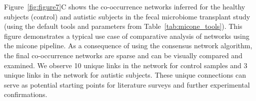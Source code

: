   Figure~\ref{fig:figure7}C shows the co-occurrence networks inferred for the healthy subjects (control) and autistic subjects in the fecal microbiome transplant study~\cite{Kang2017} (using the default tools and parameters from Table~\ref{tab:micone_tools}).
  This figure demonstrates a typical use case of comparative analysis of networks using the \ac{micone} pipeline.
  As a consequence of using the consensus network algorithm, the final co-occurrence networks are sparse and can be visually compared and examined.
  We observe 10 unique links in the network for control samples and 3 unique links in the network for autistic subjects.
  These unique connections can serve as potential starting points for literature surveys and further experimental confirmations.

